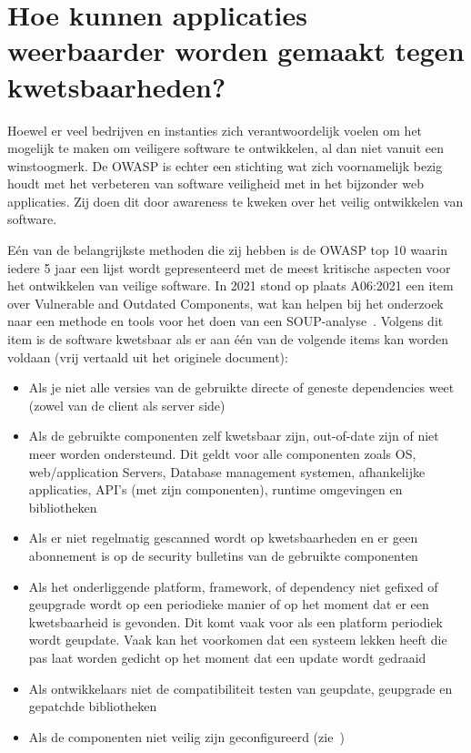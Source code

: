 \section{Hoe kunnen applicaties weerbaarder worden gemaakt tegen kwetsbaarheden?}\label{sec:hoe-kan-er-voorkomen-worden-dat-er-kwetsbaarheden-ontstaan-in-een-applicatie-die-gebruik-maakt-van-externe-bibliotheken?}

Hoewel er veel bedrijven en instanties zich verantwoordelijk voelen om het mogelijk te maken om veiligere software te ontwikkelen, al dan niet vanuit een winstoogmerk. De OWASP is echter een stichting wat zich voornamelijk bezig houdt met het verbeteren van software veiligheid met in het bijzonder web applicaties. Zij doen dit door awareness te kweken over het veilig ontwikkelen van software.

Eén van de belangrijkste methoden die zij hebben is de OWASP top 10 waarin iedere 5 jaar een lijst wordt gepresenteerd met de meest kritische aspecten voor het ontwikkelen van veilige software. In 2021 stond op plaats A06:2021 een item over Vulnerable and Outdated Components, wat kan helpen bij het onderzoek naar een methode en tools voor het doen van een SOUP-analyse~\citep{OWASP:2021}.
Volgens dit item is de software kwetsbaar als er aan één van de volgende items kan worden voldaan (vrij vertaald uit het originele document):
\begin{itemize}
    \item Als je niet alle versies van de gebruikte directe of geneste dependencies weet (zowel van de client als server side)
    \item Als de gebruikte componenten zelf kwetsbaar zijn, out-of-date zijn of niet meer worden ondersteund. Dit geldt voor alle componenten zoals OS, web/application Servers, Database management systemen, afhankelijke applicaties, API's (met zijn componenten), runtime omgevingen en bibliotheken
    \item Als er niet regelmatig gescanned wordt op kwetsbaarheden en er geen abonnement is op de security bulletins van de gebruikte componenten
    \item Als het onderliggende platform, framework, of dependency niet gefixed of geupgrade wordt op een periodieke manier of op het moment dat er een kwetsbaarheid is gevonden. Dit komt vaak voor als een platform periodiek wordt geupdate. Vaak kan het voorkomen dat een systeem lekken heeft die pas laat worden gedicht op het moment dat een update wordt gedraaid
    \item Als ontwikkelaars niet de compatibiliteit testen van geupdate, geupgrade en gepatchde bibliotheken
    \item Als de componenten niet veilig zijn geconfigureerd (zie~\citep{OWASP:2021})
\end{itemize}

